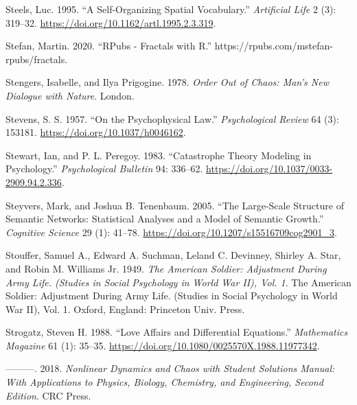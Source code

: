 \documentclass[
  a4paper,
  DIV=11,
  numbers=noendperiod,
  oneside]{scrreprt}
\newlength{\cslhangindent}
\newlength{\cslentryspacingunit} %
\newenvironment{CSLReferences}[2] %
 {%
  \setlength{\parindent}{0pt}
  \ifodd #1
  \let\oldpar\par
  \def\par{\hangindent=\cslhangindent\oldpar}
  \fi
  \setlength{\parskip}{#2\cslentryspacingunit}
 }%
 {}
\begin{document}
\begin{CSLReferences}{1}{0}
\leavevmode{}%
Steels, Luc. 1995. {``A {Self-Organizing Spatial Vocabulary}.''}
\emph{Artificial Life} 2 (3): 319--32.
\url{https://doi.org/10.1162/artl.1995.2.3.319}.

\leavevmode{}%
Stefan, Martin. 2020. {``{RPubs} - {Fractals} with {R}.''}
https://rpubs.com/mstefan-rpubs/fractals.

\leavevmode{}%
Stengers, Isabelle, and Ilya Prigogine. 1978. \emph{Order {Out} of
{Chaos}: {Man}'s {New Dialogue} with {Nature}}. {London}.

\leavevmode{}%
Stevens, S. S. 1957. {``On the Psychophysical Law.''}
\emph{Psychological Review} 64 (3): 153181.
\url{https://doi.org/10.1037/h0046162}.

\leavevmode{}%
Stewart, Ian, and P. L. Peregoy. 1983. {``Catastrophe Theory Modeling in
Psychology.''} \emph{Psychological Bulletin} 94: 336--62.
\url{https://doi.org/10.1037/0033-2909.94.2.336}.

\leavevmode{}%
Steyvers, Mark, and Joshua B. Tenenbaum. 2005. {``The {Large-Scale
Structure} of {Semantic Networks}: {Statistical Analyses} and a {Model}
of {Semantic Growth}.''} \emph{Cognitive Science} 29 (1): 41--78.
\url{https://doi.org/10.1207/s15516709cog2901_3}.

\leavevmode{}%
Stouffer, Samuel A., Edward A. Suchman, Leland C. Devinney, Shirley A.
Star, and Robin M. Williams Jr. 1949. \emph{The {American} Soldier:
{Adjustment} During Army Life. ({Studies} in Social Psychology in {World
War II}), {Vol}. 1}. The {American} Soldier: {Adjustment} During Army
Life. ({Studies} in Social Psychology in {World War II}), {Vol}. 1.
{Oxford, England}: {Princeton Univ. Press}.

\leavevmode{}%
Strogatz, Steven H. 1988. {``Love {Affairs} and {Differential
Equations}.''} \emph{Mathematics Magazine} 61 (1): 35--35.
\url{https://doi.org/10.1080/0025570X.1988.11977342}.

\leavevmode{}%
---------. 2018. \emph{Nonlinear {Dynamics} and {Chaos} with {Student
Solutions Manual}: {With Applications} to {Physics}, {Biology},
{Chemistry}, and {Engineering}, {Second Edition}}. {CRC Press}.


\end{CSLReferences}
\end{document}
